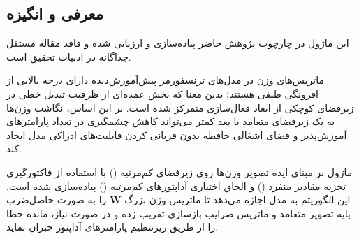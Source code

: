 \subsection{معرفی و انگیزه}
این ماژول در چارچوب پژوهش حاضر پیاده‌سازی و ارزیابی شده و فاقد مقاله مستقل جداگانه در ادبیات تحقیق است.

ماتریس‌های وزن در مدل‌های ترنسفورمر پیش‌آموزش‌دیده دارای درجه بالایی از افزونگی طیفی هستند؛ بدین معنا که بخش عمده‌ای از ظرفیت تبدیل خطی در زیرفضای کوچکی از ابعاد فعال‌سازی متمرکز شده است. بر این اساس، نگاشت وزن‌ها به یک زیرفضای متعامد با بعد کمتر می‌تواند کاهش چشمگیری در تعداد پارامترهای آموزش‌پذیر و فضای اشغالی حافظه بدون قربانی کردن قابلیت‌های ادراکی مدل ایجاد کند.

ماژول  بر مبنای ایده تصویر وزن‌ها روی زیرفضای کم‌مرتبه () با استفاده از فاکتورگیری تجزیه مقادیر منفرد () و الحاق اختیاری آداپتورهای کم‌مرتبه () پیاده‌سازی شده است. این الگوریتم به مدل اجازه می‌دهد تا ماتریس وزن بزرگ $\mathbf{W}$ را به صورت حاصل‌ضرب پایه تصویر متعامد و ماتریس ضرایب بازسازی تقریب زده و در صورت نیاز، مانده خطا را از طریق ریزتنظیم پارامترهای آداپتور جبران نماید.
